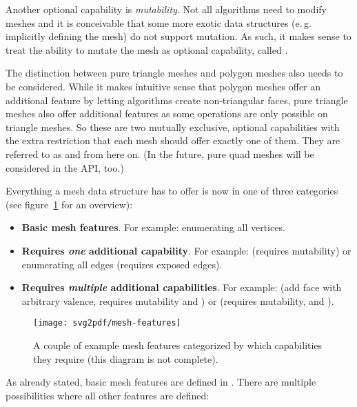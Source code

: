 Another optional capability is \emph{mutability}.
Not all algorithms need to modify meshes and it is conceivable that some more exotic data structures (e.\,g. implicitly defining the mesh) do not support mutation.
As such, it makes sense to treat the ability to mutate the mesh as optional capability, called .

The distinction between pure triangle meshes and polygon meshes also needs to be considered.
While it makes intuitive sense that polygon meshes offer an additional feature by letting algorithms create non-triangular faces, pure triangle meshes also offer additional features as some operations are only possible on triangle meshes.
So these are two mutually exclusive, optional capabilities with the extra restriction that each mesh should offer exactly one of them.
They are referred to as  and  from here on.
(In the future, pure quad meshes will be considered in the API, too.)

Everything a mesh data structure has to offer is now in one of three categories (see figure~\ref{fig:mesh-features} for an overview):

\begin{itemize}
  \item \textbf{Basic mesh features}. For example: enumerating all vertices.
  \item \textbf{Requires \emph{one} additional capability}. For example:  (requires mutability) or enumerating all edges (requires exposed edges).
  \item \textbf{Requires \emph{multiple} additional capabilities}. For example:  (add face with arbitrary valence, requires mutability and ) or  (requires mutability,  and ). %
\end{itemize}

\begin{figure}[t]
  \centering
  \texttt{[image: svg2pdf/mesh-features]}
  \caption{
    A couple of example mesh features categorized by which capabilities they require (this diagram is not complete).
  }
  \label{fig:mesh-features}
\end{figure}

As already stated, basic mesh features are defined in .
There are multiple possibilities where all other features are defined:

